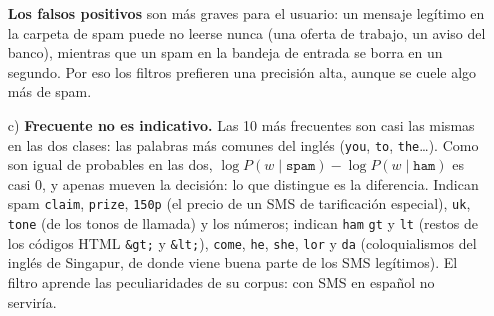 \documentclass{article}
\begin{document}
\begin{enumerate}
    \textbf{Los falsos positivos} son más graves para el usuario: un mensaje legítimo en la carpeta de spam puede no leerse nunca (una oferta de trabajo, un aviso del banco), mientras que un spam en la bandeja de entrada se borra en un segundo. Por eso los filtros prefieren una precisión alta, aunque se cuele algo más de spam.

    \item[c)] \textbf{Frecuente no es indicativo.} Las 10 más frecuentes son casi las mismas en las dos clases: las palabras más comunes del inglés (\texttt{you}, \texttt{to}, \texttt{the}\dots). Como son igual de probables en las dos, $\log P(w \mid \texttt{spam}) - \log P(w \mid \texttt{ham})$ es casi 0, y apenas mueven la decisión: lo que distingue es la diferencia. Indican spam \texttt{claim}, \texttt{prize}, \texttt{150p} (el precio de un SMS de tarificación especial), \texttt{uk}, \texttt{tone} (de los tonos de llamada) y los números; indican \texttt{ham} \texttt{gt} y \texttt{lt} (restos de los códigos HTML \texttt{\&gt;} y \texttt{\&lt;}), \texttt{come}, \texttt{he}, \texttt{she}, \texttt{lor} y \texttt{da} (coloquialismos del inglés de Singapur, de donde viene buena parte de los SMS legítimos). El filtro aprende las peculiaridades de su corpus: con SMS en español no serviría.

\end{enumerate}
\end{document}
